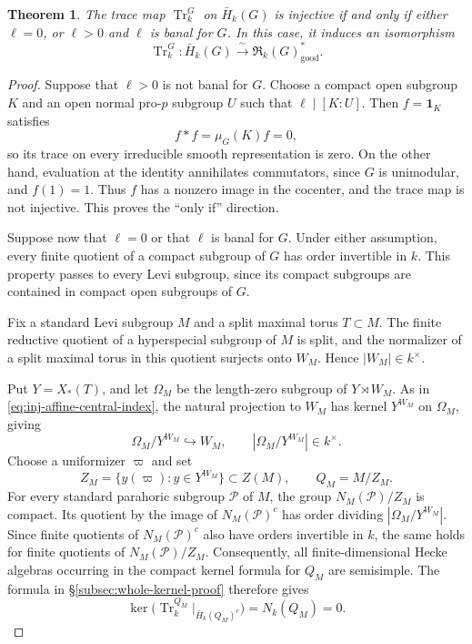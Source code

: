 \documentclass[11pt,letterpaper]{amsart}
\newtheorem{theorem}{Theorem}
\theoremstyle{definition}
\numberwithin{equation}{section}
\numberwithin{theorem}{section}
\newcommand{\kk}{k}
\newcommand{\cR}{\mathfrak R}
\DeclareMathOperator{\Tr}{Tr}
\begin{document}
\begin{theorem}\label{thm:inj-split-whole}
The trace map $\Tr_\kk^G$ on $\bar H_\kk(G)$ is
injective if and only if either $\ell=0$, or
$\ell>0$ and $\ell$ is banal for $G$.
In this case, it induces an isomorphism
\[
 \Tr_\kk^G:\bar H_\kk(G)
       \xrightarrow{\;\sim\;}
       \cR_\kk(G)^*_{\mathrm{good}}.
\]
\end{theorem}

\begin{proof}
Suppose that $\ell>0$ is not banal for $G$.
Choose a compact open subgroup $K$ and an open
normal pro-$p$ subgroup $U$ such that
$\ell\mid[K:U]$.
Then $f=\mathbf 1_K$ satisfies
\[
 f*f=\mu_G(K)f=0,
\]
so its trace on every irreducible smooth
representation is zero.
On the other hand, evaluation at the identity
annihilates commutators, since $G$ is unimodular,
and $f(1)=1$.
Thus $f$ has a nonzero image in the cocenter,
and the trace map is not injective.
This proves the ``only if'' direction.

Suppose now that $\ell=0$ or that $\ell$ is banal
for $G$.
Under either assumption, every finite quotient of
a compact subgroup of $G$ has order invertible
in $\kk$.
This property passes to every Levi subgroup,
since its compact subgroups are contained in
compact open subgroups of $G$.

Fix a standard Levi subgroup $M$ and a split
maximal torus $T\subset M$.
The finite reductive quotient of a hyperspecial
subgroup of $M$ is split, and the normalizer of
a split maximal torus in this quotient surjects
onto $W_M$.
Hence $|W_M|\in\kk^\times$.

Put $Y=X_*(T)$, and let $\Omega_M$ be the
length-zero subgroup of $Y\rtimes W_M$.
As in \eqref{eq:inj-affine-central-index},
the natural projection to $W_M$ has kernel
$Y^{W_M}$ on $\Omega_M$, giving
\begin{equation}\label{eq:inj-split-central-index}
 \Omega_M/Y^{W_M}\hookrightarrow W_M,
 \qquad |\Omega_M/Y^{W_M}|\in\kk^\times.
\end{equation}
Choose a uniformizer $\varpi$ and set
\[
 Z_M=\{y(\varpi):y\in Y^{W_M}\}\subset Z(M),
 \qquad Q_M=M/Z_M.
\]
For every standard parahoric subgroup $\mathcal P$
of $M$, the group $N_M(\mathcal P)/Z_M$ is compact.
Its quotient by the image of $N_M(\mathcal P)^c$
has order dividing $|\Omega_M/Y^{W_M}|$.
Since finite quotients of $N_M(\mathcal P)^c$
also have orders invertible in $\kk$, the same
holds for finite quotients of
$N_M(\mathcal P)/Z_M$.
Consequently, all finite-dimensional Hecke algebras
occurring in the compact kernel formula for $Q_M$
are semisimple.
The formula in \S\ref{subsec:whole-kernel-proof}
therefore gives
\begin{equation}\label{eq:inj-split-quotient}
 \ker\bigl(\Tr_\kk^{Q_M}|_{\bar H_\kk(Q_M)^c}\bigr)
   =N_\kk(Q_M)=0.
\end{equation}


\end{proof}
\end{document}
